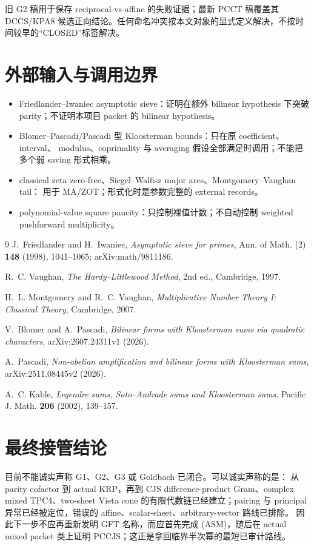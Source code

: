\documentclass[11pt,a4paper]{ctexart}
\theoremstyle{definition}
\newcommand{\1}{\mathbf 1}
\begin{document}
旧 G2 稿用于保存 reciprocal-vs-affine 的失败证据；最新 PCCT 稿覆盖其 DCCS/KPA8
候选正向结论。任何命名冲突按本文对象的显式定义解决，不按时间较早的“CLOSED”标签解决。

\section{外部输入与调用边界}

\begin{itemize}
\item Friedlander--Iwaniec asymptotic sieve：证明在额外 bilinear hypothesis 下突破
parity；不证明本项目 packet 的 bilinear hypothesis。
\item Blomer--Pascadi/Pascadi 型 Kloosterman bounds：只在原 coefficient、interval、
modulus、coprimality 与 averaging 假设全部满足时调用；不能把多个弱 saving 形式相乘。
\item classical zeta zero-free、Siegel--Walfisz major arcs、Montgomery--Vaughan tail：
用于 MA/ZOT；形式化时是参数完整的 external records。
\item polynomial-value square paucity：只控制裸值计数；不自动控制 weighted
pushforward multiplicity。
\end{itemize}

\begin{thebibliography}{9}
J.~Friedlander and H.~Iwaniec,
\emph{Asymptotic sieve for primes},
Ann. of Math. (2) \textbf{148} (1998), 1041--1065;
arXiv:math/9811186.

R.~C. Vaughan, \emph{The Hardy--Littlewood Method}, 2nd ed., Cambridge, 1997.

H.~L. Montgomery and R.~C. Vaughan,
\emph{Multiplicative Number Theory I: Classical Theory}, Cambridge, 2007.

V.~Blomer and A.~Pascadi,
\emph{Bilinear forms with Kloosterman sums via quadratic characters},
arXiv:2607.24311v1 (2026).

A.~Pascadi,
\emph{Non-abelian amplification and bilinear forms with Kloosterman sums},
arXiv:2511.08445v2 (2026).

A.~C. Kable,
\emph{Legendre sums, Soto--Andrade sums and Kloosterman sums},
Pacific J. Math. \textbf{206} (2002), 139--157.
\end{thebibliography}

\section*{最终接管结论}

目前不能诚实声称 G1、G2、G3 或 Goldbach 已闭合。可以诚实声称的是：
从 parity cofactor 到 actual KRP，再到 CJS difference-product Gram、complex
mixed TPC4、two-sheet Vieta cone 的有限代数链已经建立；pairing 与 principal
异常已经被定位，错误的 affine、scalar-sheet、arbitrary-vector 路线已排除。
因此下一步不应再重新发明 GFT 名称，而应首先完成 (ASM)，随后在 actual mixed
packet 类上证明 PCCJS；这正是拿回临界半次幂的最短已审计路线。
\end{document}
